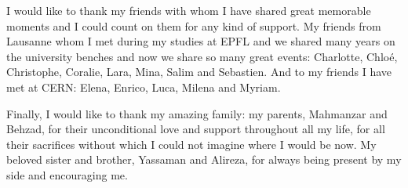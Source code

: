 I would like to thank my friends with whom I have shared great
memorable moments and I could count on them for any kind of
support. My friends from Lausanne whom I met during my studies at EPFL
and we shared many years on the university benches and now we share so
many great events: Charlotte, Chloé, Christophe, Coralie, Lara, Mina,
Salim and Sebastien. And to my friends I have met at CERN: Elena,
Enrico, Luca, Milena and Myriam.

Finally, I would like to thank my amazing family: my parents,
Mahmanzar and Behzad, for their unconditional love and support
throughout all my life, for all their sacrifices without which I could
not imagine where I would be now. My beloved sister and brother,
Yassaman and Alireza, for always being present by my side and
encouraging me.


